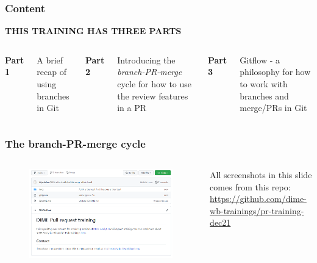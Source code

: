 \documentclass[aspectratio=169]{beamer}
\newcommand{\trainingURL}[1]{{\color{blue}\url{#1}}}
\newcommand{\trainingRepoURL}{\href{https://github.com/dime-wb-trainings/pr-training-dec21}
{\trainingURL{https://github.com/dime-wb-trainings/pr-training-dec21}}}
\begin{document}
\begin{frame}
	\frametitle{Content}

	\Large\centering \textbf{THIS TRAINING HAS THREE PARTS}

	\vspace{1.2em}

	\raggedright
	\begin{columns}[T]

			\large \textbf{Part 1}
			
			\vspace{1em}
			\raggedright
			\normalfont A brief recap of using branches in Git

			\large \textbf{Part 2}
			
			\vspace{1em}
			\raggedright
			\normalfont Introducing the \textit{branch-PR-merge} cycle for how to use the review features in a PR
			
			\large \textbf{Part 3}
			
			\vspace{1em}
			\raggedright
			\normalfont Gitflow - a philosophy for how to work with branches and merge/PRs in Git
		

	\end{columns}
\end{frame}


\begin{frame}
	\frametitle{The branch-PR-merge cycle}
	
	\begin{columns}[c]
		
		\vspace{1cm}  %
		\begin{figure}
			\centering
			\includegraphics[width=\textwidth]{./img/training-repo.png}
		\end{figure}
	
		All screenshots in this slide comes from this repo: \trainingRepoURL{}
		
	\end{columns}
\end{frame}
\end{document}

